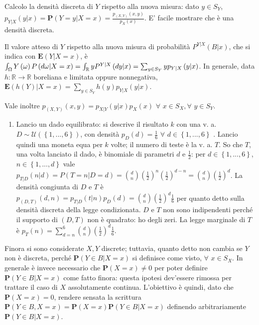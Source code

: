 \documentclass{article}
\begin{document}
Calcolo la densit\`{a} discreta di $Y$ rispetto alla nuova misura: dato $%
y\in S_{Y}$, $p_{Y|X}\left( y|x\right) =\mathbf{P}\left( Y=y|X=x\right) =%
\frac{p_{\left( X,Y\right) }\left( x,y\right) }{p_{X}\left( x\right) }$. E'
facile mostrare che \`{e} una densit\`{a} discreta.

Il valore atteso di $Y$ rispetto alla nuova misura di probabilit\`{a} $%
P^{Y|X}\left( B|x\right) $, che si indica con $\mathbf{E}\left( Y|X=x\right) 
$, \`{e} $\int_{\Omega }Y\left( \omega \right) P\left( d\omega |X=x\right)
=\int_{%
\mathbb{R}
}yP^{Y|X}\left( dy|x\right) =\sum_{y\in S_{Y}}yp_{Y|X}\left( y|x\right) $.
In generale, data $h:%
\mathbb{R}
\rightarrow 
\mathbb{R}
$ boreliana e limitata oppure nonnegativa, $\mathbf{E}\left( h\left(
Y\right) |X=x\right) =\sum_{y\in S_{Y}}h\left( y\right) p_{Y|X}\left(
y|x\right) $.

Vale inoltre $p_{\left( X,Y\right) }\left( x,y\right) =p_{X|Y}\left(
y|x\right) p_{X}\left( x\right) $ $\forall $ $x\in S_{X},\forall $ $y\in
S_{Y}$.

\begin{enumerate}
\item Lancio un dado equilibrato: si descrive il risultato $k$ con una v. a. 
$D\sim \mathcal{U}\left( \left\{ 1,...,6\right\} \right) $, con densit\`{a} $%
p_{D}\left( d\right) =\frac{1}{6}$ $\forall $ $d\in \left\{ 1,...,6\right\} $%
. Lancio quindi una moneta equa per $k$ volte; il numero di teste \`{e} la
v. a. $T$. So che $T$, una volta lanciato il dado, \`{e} binomiale di
parametri $d$ e $\frac{1}{2}$: per $d\in \left\{ 1,...,6\right\} $, $n\in
\left\{ 1,...,d\right\} $ vale $p_{T|D}\left( n|d\right) =P\left(
T=n|D=d\right) =\binom{d}{n}\left( \frac{1}{2}\right) ^{n}\left( \frac{1}{2}%
\right) ^{d-n}=\binom{d}{n}\left( \frac{1}{2}\right) ^{d}$. La densit\`{a}
congiunta di $D$ e $T$ \`{e} $p_{\left( D,T\right) }\left( d,n\right)
=p_{T|D}\left( t|n\right) p_{D}\left( d\right) =\binom{d}{n}\left( \frac{1}{2%
}\right) ^{d}\frac{1}{6}$ per quanto detto sulla densit\`{a} discreta della
legge condizionata. $D$ e $T$ non sono indipendenti perch\'{e} il supporto
di $\left( D,T\right) $ non \`{e} quadrato: ho degli zeri. La legge
marginale di $T$ \`{e} $p_{T}\left( n\right) =\sum_{d=n}^{6}\binom{d}{n}%
\left( \frac{1}{2}\right) ^{d}\frac{1}{6}$.
\end{enumerate}

Finora si sono considerate $X,Y$ discrete; tuttavia, quanto detto non cambia
se $Y$ non \`{e} discreta, perch\'{e} $\mathbf{P}\left( Y\in B|X=x\right) $
si definisce come visto, $\forall $ $x\in S_{X}$. In generale \`{e} invece
necessario che $\mathbf{P}\left( X=x\right) \neq 0$ per poter definire $%
\mathbf{P}\left( Y\in B|X=x\right) $ come fatto finora: questa ipotesi
dev'essere rimossa per trattare il caso di $X$ assolutamente continua.
L'obiettivo \`{e} quindi, dato che $\mathbf{P}\left( X=x\right) =0$, rendere
sensata la scrittura $\mathbf{P}\left( Y\in B,X=x\right) =\mathbf{P}\left(
X=x\right) \mathbf{P}\left( Y\in B|X=x\right) $ definendo arbitrariamente $%
\mathbf{P}\left( Y\in B|X=x\right) $.
\end{document}
